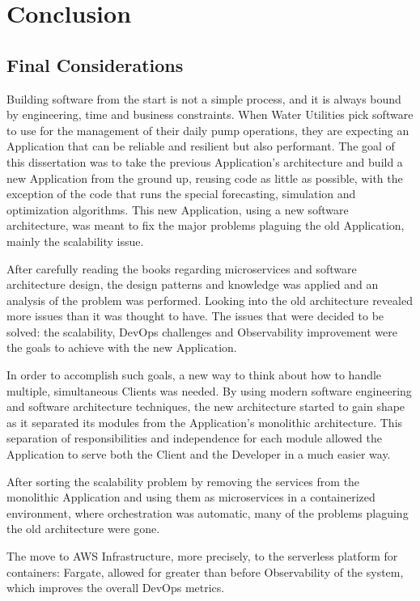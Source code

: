 \chapter{Conclusion}\label{conclusion}

\section{Final Considerations}\label{conclusion:s:final-considerations}

Building software from the start is not a simple process, and it is always bound by engineering, time and business constraints. When Water Utilities pick software to use for the management of their daily pump operations, they are expecting an Application that can be reliable and resilient but also performant. 
The goal of this dissertation was to take the previous Application's architecture and build a new Application from the ground up, reusing code as little as possible, with the exception of the code that runs the special forecasting, simulation and optimization algorithms. This new Application, using a new software architecture, was meant to fix the major problems plaguing the old Application, mainly the scalability issue.

After carefully reading the books regarding microservices and software architecture design, the design patterns and knowledge was applied and an analysis of the problem was performed.
Looking into the old architecture revealed more issues than it was thought to have. The issues that were decided to be solved: the scalability, DevOps challenges and Observability improvement were the goals to achieve with the new Application.

In order to accomplish such goals, a new way to think about how to handle multiple, simultaneous Clients was needed. By using modern software engineering and software architecture techniques, the new architecture started to gain shape as it separated its modules from the Application's monolithic architecture. This separation of responsibilities and independence for each module allowed the Application to serve both the Client and the Developer in a much easier way.

After sorting the scalability problem by removing the services from the monolithic Application and using them as microservices in a containerized environment, where orchestration was automatic, many of the problems plaguing the old architecture were gone.

The move to AWS Infrastructure, more precisely, to the serverless platform for containers: Fargate, allowed for greater than before Observability of the system, which improves the overall DevOps metrics.

